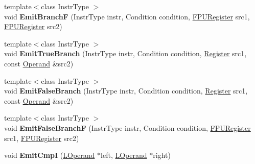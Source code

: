 \begin{DoxyCompactItemize}
\item 
{\footnotesize template$<$class Instr\+Type $>$ }\\void {\bfseries Emit\+BranchF} (Instr\+Type instr, Condition condition, \hyperlink{structv8_1_1internal_1_1_double_register}{F\+P\+U\+Register} src1, \hyperlink{structv8_1_1internal_1_1_double_register}{F\+P\+U\+Register} src2)\hypertarget{classv8_1_1internal_1_1_l_code_gen_a1a2d953ebfcde90d986e25142355669a}{}\label{classv8_1_1internal_1_1_l_code_gen_a1a2d953ebfcde90d986e25142355669a}

\item 
{\footnotesize template$<$class Instr\+Type $>$ }\\void {\bfseries Emit\+True\+Branch} (Instr\+Type instr, Condition condition, \hyperlink{structv8_1_1internal_1_1_register}{Register} src1, const \hyperlink{classv8_1_1internal_1_1_operand}{Operand} \&src2)\hypertarget{classv8_1_1internal_1_1_l_code_gen_ab2fd64035fa0633a32c4b2b5a02e574c}{}\label{classv8_1_1internal_1_1_l_code_gen_ab2fd64035fa0633a32c4b2b5a02e574c}

\item 
{\footnotesize template$<$class Instr\+Type $>$ }\\void {\bfseries Emit\+False\+Branch} (Instr\+Type instr, Condition condition, \hyperlink{structv8_1_1internal_1_1_register}{Register} src1, const \hyperlink{classv8_1_1internal_1_1_operand}{Operand} \&src2)\hypertarget{classv8_1_1internal_1_1_l_code_gen_a32a537c6acd71f81aaf9003450fbb280}{}\label{classv8_1_1internal_1_1_l_code_gen_a32a537c6acd71f81aaf9003450fbb280}

\item 
{\footnotesize template$<$class Instr\+Type $>$ }\\void {\bfseries Emit\+False\+BranchF} (Instr\+Type instr, Condition condition, \hyperlink{structv8_1_1internal_1_1_double_register}{F\+P\+U\+Register} src1, \hyperlink{structv8_1_1internal_1_1_double_register}{F\+P\+U\+Register} src2)\hypertarget{classv8_1_1internal_1_1_l_code_gen_a4f258e0f91fc915ba419271f477fa080}{}\label{classv8_1_1internal_1_1_l_code_gen_a4f258e0f91fc915ba419271f477fa080}

\item 
void {\bfseries Emit\+CmpI} (\hyperlink{classv8_1_1internal_1_1_l_operand}{L\+Operand} $\ast$left, \hyperlink{classv8_1_1internal_1_1_l_operand}{L\+Operand} $\ast$right)\hypertarget{classv8_1_1internal_1_1_l_code_gen_acf842065a54732189712be561bf934b3}{}\label{classv8_1_1internal_1_1_l_code_gen_acf842065a54732189712be561bf934b3}


\end{DoxyCompactItemize}
